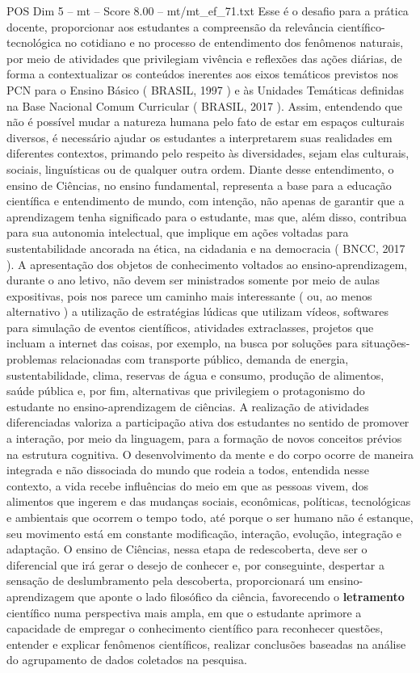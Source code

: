\begin{textsample}{POS Dim 5 – mt – Score 8.00 – mt/mt\_ef\_71.txt}
Esse é o desafio para a prática docente, proporcionar aos estudantes a compreensão da relevância científico-tecnológica no cotidiano e no processo de entendimento dos fenômenos naturais, por meio de atividades que privilegiam vivência e reflexões das ações diárias, de forma a contextualizar os conteúdos inerentes aos eixos temáticos previstos nos PCN para o Ensino Básico ( BRASIL, 1997 ) e às Unidades Temáticas definidas na Base Nacional Comum Curricular ( BRASIL, 2017 ).
Assim, entendendo que não é possível mudar a natureza humana pelo fato de estar em espaços culturais diversos, é necessário ajudar os estudantes a interpretarem suas realidades em diferentes contextos, primando pelo respeito às diversidades, sejam elas culturais, sociais, linguísticas ou de qualquer outra ordem.
Diante desse entendimento, o ensino de Ciências, no ensino fundamental, representa a base para a educação científica e entendimento de mundo, com intenção, não apenas de garantir que a aprendizagem tenha significado para o estudante, mas que, além disso, contribua para sua autonomia intelectual, que implique em ações voltadas para sustentabilidade ancorada na ética, na cidadania e na democracia ( BNCC, 2017 ).
A apresentação dos objetos de conhecimento voltados ao ensino-aprendizagem, durante o ano letivo, não devem ser ministrados somente por meio de aulas expositivas, pois nos parece um caminho mais interessante ( ou, ao menos alternativo ) a utilização de estratégias lúdicas que utilizam vídeos, softwares para simulação de eventos científicos, atividades extraclasses, projetos que incluam a internet das coisas, por exemplo, na busca por soluções para situações-problemas relacionadas com transporte público, demanda de energia, sustentabilidade, clima, reservas de água e consumo, produção de alimentos, saúde pública e, por fim, alternativas que privilegiem o protagonismo do estudante no ensino-aprendizagem de ciências.
A realização de atividades diferenciadas valoriza a participação ativa dos estudantes no sentido de promover a interação, por meio da linguagem, para a formação de novos conceitos prévios na estrutura cognitiva.
O desenvolvimento da mente e do corpo ocorre de maneira integrada e não dissociada do mundo que rodeia a todos, entendida nesse contexto, a vida recebe influências do meio em que as pessoas vivem, dos alimentos que ingerem e das mudanças sociais, econômicas, políticas, tecnológicas e ambientais que ocorrem o tempo todo, até porque o ser humano não é estanque, seu movimento está em constante modificação, interação, evolução, integração e adaptação.
O ensino de Ciências, nessa etapa de redescoberta, deve ser o diferencial que irá gerar o desejo de conhecer e, por conseguinte, despertar a sensação de deslumbramento pela descoberta, proporcionará um ensino-aprendizagem que aponte o lado filosófico da ciência, favorecendo o \textbf{letramento} científico numa perspectiva mais ampla, em que o estudante aprimore a capacidade de empregar o conhecimento científico para reconhecer questões, entender e explicar fenômenos científicos, realizar conclusões baseadas na análise do agrupamento de dados coletados na pesquisa.

\end{textsample}
